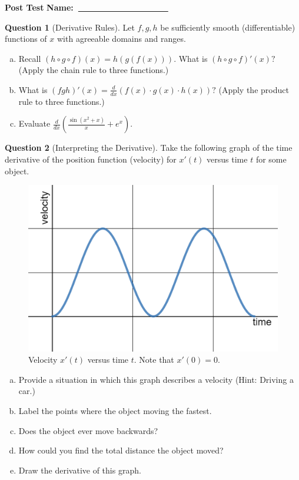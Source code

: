 \documentclass[12pt]{article}
\theoremstyle{definition}
\newtheorem{question}{Question}
\begin{document}
\noindent
\LARGE\textbf{Post Test} \hfill \textbf{Name:~\underline{~~~~~~~~~~~~~~~~~~~}}\\

\normalsize
\begin{question}[Derivative Rules] Let $f,g,h$ be sufficiently smooth (differentiable) functions of $x$ with agreeable domains and ranges.  
    \begin{enumerate}[(a)]
        \item Recall $(h\circ g \circ f)(x)=h(g(f(x)))$. What is $(h\circ g \circ f)'(x)?$ (Apply the chain rule to three functions.)
        \item What is $(fgh)'(x)=\frac{d}{dx}(f(x)\cdot g(x)\cdot h(x))?$ (Apply the product rule to three functions.)
        \item Evaluate $\frac{d}{dx} \left( \frac{\sin (x^2+x)}{x}+e^x\right).$
    \end{enumerate}
\end{question}

\pagebreak




\begin{question}[Interpreting the Derivative]
Take the following graph of the time derivative of the position function (velocity) for $x'(t)$ versus time $t$ for some object.\\

\begin{figure}[h]
    \centering
    \includegraphics[scale=.2]{desmos-graph.png}
    \caption{Velocity $x'(t)$ versus time $t$. Note that $x'(0)=0.$}
    \label{fig:my_label}
\end{figure}
\begin{enumerate}[(a)]
    \item Provide a situation in which this graph describes a velocity (Hint: Driving a car.)
    \item Label the points where the object moving the fastest.
    \item Does the object ever move backwards?
    \item How could you find the total distance the object moved?
    \item Draw the derivative of this graph.
\end{enumerate}
\end{question}
\end{document}
